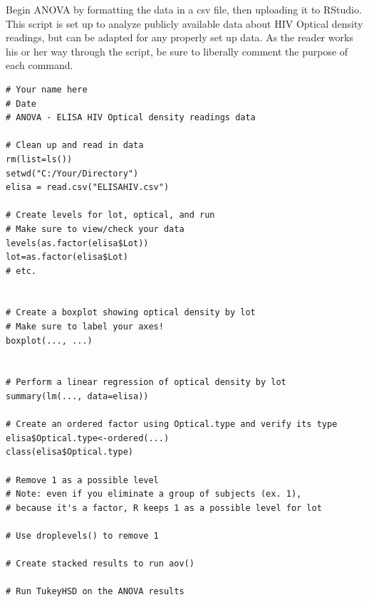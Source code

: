 \documentclass[11pt]{article}
\begin{document}
Begin ANOVA by formatting the data in a csv file, then uploading it to RStudio. This script is set up to analyze publicly available data about HIV Optical density readings, but can be adapted for any properly set up data. As the reader works his or her way through the script, be sure to liberally comment the purpose of each command. 

\begin{verbatim}
# Your name here
# Date
# ANOVA - ELISA HIV Optical density readings data

# Clean up and read in data
rm(list=ls())
setwd("C:/Your/Directory")
elisa = read.csv("ELISAHIV.csv")

# Create levels for lot, optical, and run
# Make sure to view/check your data
levels(as.factor(elisa$Lot))
lot=as.factor(elisa$Lot)
# etc.


# Create a boxplot showing optical density by lot
# Make sure to label your axes!
boxplot(..., ...)


# Perform a linear regression of optical density by lot
summary(lm(..., data=elisa))

# Create an ordered factor using Optical.type and verify its type
elisa$Optical.type<-ordered(...)
class(elisa$Optical.type)

# Remove 1 as a possible level
# Note: even if you eliminate a group of subjects (ex. 1),
# because it's a factor, R keeps 1 as a possible level for lot

# Use droplevels() to remove 1

# Create stacked results to run aov()

# Run TukeyHSD on the ANOVA results

\end{verbatim}
\end{document}
